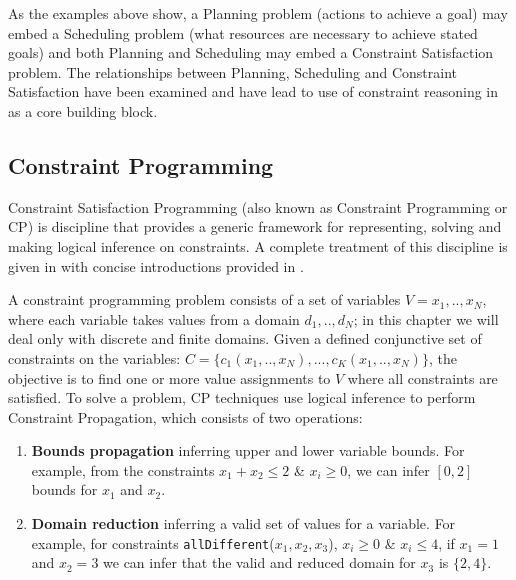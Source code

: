 {As the examples above show, a Planning problem (actions to achieve a
goal) may embed a Scheduling problem (what resources are necessary to
achieve stated goals) and both Planning and Scheduling may embed a
Constraint Satisfaction problem.  The relationships between Planning,
Scheduling and Constraint Satisfaction have been examined
\cite{smith00} and have lead to use of constraint reasoning in \eu as
a core building block.

\subsection{Constraint Programming}
\label{sec:europa:cp}

Constraint Satisfaction Programming (also known as Constraint
Programming or \textsf{CP}) is  discipline that
provides a generic framework for representing, solving and making
logical inference on constraints. A complete treatment of this
discipline is given in \cite{marriott98,apt03} with concise
introductions provided in \cite{bartak99,lustig01}.

A constraint programming problem consists of a set of variables $V=
{x_1,..,x_N}$, where each variable takes values from a domain
$d_1,..,d_N$; in this chapter we will deal only with discrete and
finite domains. Given a defined conjunctive set of constraints
 on the variables: $C=\{c_1(x_1,..,x_N), ...,
c_K(x_1,..,x_N)\}$, the objective is to find one or more value
assignments to $V$ where all constraints are satisfied. To solve a
problem, \textsf{CP} techniques use logical inference to perform
Constraint Propagation, which consists of two operations:

\begin{enumerate}

\item \textbf{Bounds propagation} inferring upper and lower variable
  bounds. For example, from the constraints $x_1 + x_2 \leq 2$ \& $x_i
  \geq 0$, we can infer $[0,2]$ bounds for $x_1$ and $x_2$.

\item \textbf{Domain reduction} inferring a valid set of values for a
  variable.  For example, for constraints
  \texttt{allDifferent}($x_1,x_2,x_3$), $x_i \geq 0$ \& $x_i \leq 4$,
  if $x_1 = 1$ and $x_2 = 3$ we can infer that the valid and reduced
  domain for $x_3$ is $\{2,4\}$.

\end{enumerate}

}
